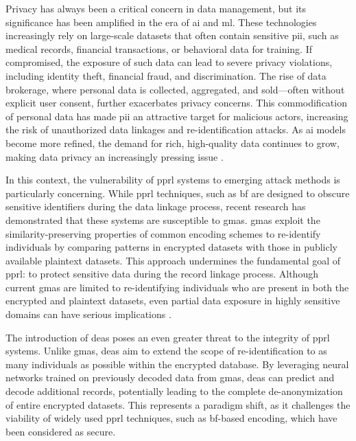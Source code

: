 Privacy has always been a critical concern in data management, but its significance has been amplified in the era of \ac{ai} and \ac{ml}. 
These technologies increasingly rely on large-scale datasets that often contain sensitive \ac{pii}, such as medical records, financial transactions, or behavioral data for training. If compromised, the exposure of such data can lead to severe privacy violations, including identity theft, financial fraud, and discrimination. 
The rise of data brokerage, where personal data is collected, aggregated, and sold—often without explicit user consent, further exacerbates privacy concerns. 
This commodification of personal data has made \ac{pii} an attractive target for malicious actors, increasing the risk of unauthorized data linkages and re-identification attacks.
As \ac{ai} models become more refined, the demand for rich, high-quality data continues to grow, making data privacy an increasingly pressing issue \cite{king2024rethinking, manheim2019artificial}.

In this context, the vulnerability of \ac{pprl} systems to emerging attack methods is particularly concerning. 
While \ac{pprl} techniques, such as \ac{bf} are designed to obscure sensitive identifiers during the data linkage process, recent research has demonstrated that these systems are susceptible to \ac{gma}s. 
\ac{gma}s exploit the similarity-preserving properties of common encoding schemes to re-identify individuals by comparing patterns in encrypted datasets with those in publicly available plaintext datasets. 
This approach undermines the fundamental goal of \ac{pprl}: to protect sensitive data during the record linkage process. 
Although current \ac{gma}s are limited to re-identifying individuals who are present in both the encrypted and plaintext datasets, even partial data exposure in highly sensitive domains can have serious implications \cite{schaefer2024,vidanage2020graph}.

The introduction of \ac{dea}s poses an even greater threat to the integrity of \ac{pprl} systems. 
Unlike \ac{gma}s, \ac{dea}s aim to extend the scope of re-identification to as many individuals as possible within the encrypted database. 
By leveraging neural networks trained on previously decoded data from \ac{gma}s, \ac{dea}s can predict and decode additional records, potentially leading to the complete de-anonymization of entire encrypted datasets. 
This represents a paradigm shift, as it challenges the viability of widely used \ac{pprl} techniques, such as \ac{bf}-based encoding, which have been considered as secure.

